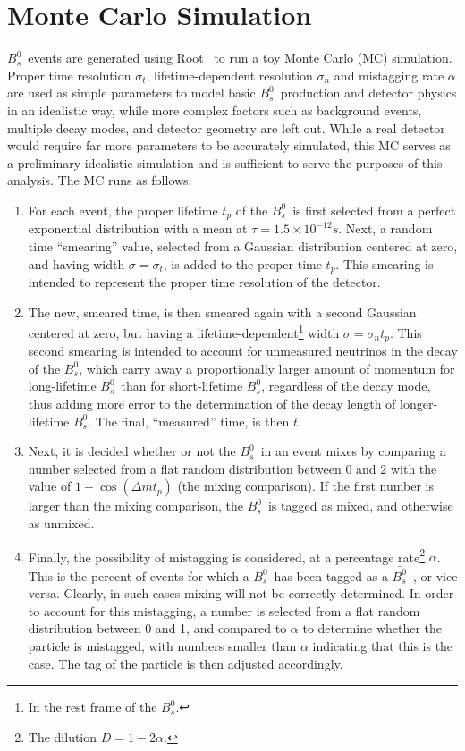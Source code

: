 \documentclass[10pt]{article}
\newcommand{\Bs}{\mbox{$B_{s}^{0}$}}
\newcommand{\Bsbar}{\mbox{$\bar{B_{s}^{0}}$}}
\begin{document}
\section{Monte Carlo Simulation}

\Bs\ events are generated using Root~\cite{root} to run a toy
Monte Carlo (MC) simulation.  Proper time resolution $\sigma_t$,
lifetime-dependent resolution $\sigma_n$ and mistagging rate
$\alpha$ are used as simple parameters to model basic \Bs\
production and detector physics in an idealistic way, while more
complex factors such as background events, multiple decay modes,
and detector geometry are left out. While a real detector would
require far more parameters to be accurately simulated, this MC
serves as a preliminary idealistic simulation and is sufficient
to serve the purposes of this analysis. The MC runs as follows:

\begin{enumerate}
\item For each event, the proper lifetime $t_p$ of the \Bs\ is
first selected from a  perfect exponential distribution with a
mean at $\tau = 1.5 \times 10^{-12}s$. Next, a random time
``smearing'' value, selected from a Gaussian distribution centered
at zero, and having width $\sigma = \sigma_t$, is added to the
proper time $t_p$. This smearing is intended to represent the
proper time resolution of the detector.

\item The new, smeared time, is then smeared again with a second
Gaussian centered  at zero, but having a
lifetime-dependent\footnote{In the rest frame of the \Bs.}
width $\sigma = \sigma_nt_p$.  This second smearing is intended to
account for unmeasured neutrinos in the decay of the \Bs, which
carry away a proportionally larger amount of momentum for
long-lifetime \Bs\ than for short-lifetime \Bs, regardless of the
decay mode, thus adding more error to the determination of the
decay length of longer-lifetime \Bs.  The final, ``measured''
time, is then $t$.

\item Next, it is decided whether or not the \Bs\ in an event
mixes by comparing a  number selected from a flat random
distribution between 0 and 2 with the value of $1+\cos(\Delta m
t_p)$ (the mixing comparison).  If the first number is larger than
the mixing comparison, the \Bs\ is tagged as mixed, and otherwise
as unmixed.

\item Finally, the possibility of mistagging is considered, at a
percentage  rate\footnote{\label{dilution}The dilution $D =
1-2\alpha$.} $\alpha$.  This is the percent of events for which a
\Bs\ has been tagged as a \Bsbar\ , or vice versa.  Clearly, in
such cases mixing will not be correctly determined. In order to
account for this mistagging, a number is selected from a flat
random distribution between 0 and 1, and compared to $\alpha$ to
determine whether the particle is mistagged, with numbers smaller
than $\alpha$ indicating that this is the case.  The tag of the
particle is then adjusted accordingly.
\end{enumerate}
\end{document}
